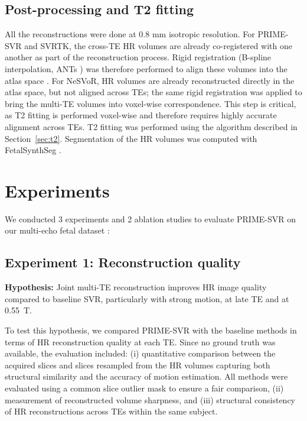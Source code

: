 \documentclass[preprint,authoryear,12pt]{elsarticle}
\begin{document}
\subsection{Post-processing and T2 fitting}

All the reconstructions were done at 0.8 mm isotropic resolution.
For PRIME-SVR and SVRTK, the cross-TE HR volumes are already co-registered with one another as part of the reconstruction process. Rigid registration (B-spline interpolation, ANTs \citep{avants2009ants}) was therefore performed to align these volumes into the atlas space \citep{gholipour_normative_2017}. For NeSVoR, HR volumes are already reconstructed directly in the atlas space, but not aligned across TEs; the same rigid registration was applied to bring the multi-TE volumes into voxel-wise correspondence. This step is critical, as T2 fitting is performed voxel-wise and therefore requires highly accurate alignment across TEs. T2 fitting was performed using the algorithm described in Section~\ref{sec:t2}. Segmentation of the HR volumes was computed with FetalSynthSeg \citep{zalevskyi2026evaluating}.

\newpage

\section{Experiments}

We conducted 3 experiments and 2 ablation studies to evaluate PRIME-SVR on our multi-echo fetal dataset  : 

\subsection{Experiment 1: Reconstruction quality}
\begin{boxK}
\noindent\textbf{Hypothesis:} Joint multi-TE reconstruction improves HR image quality compared to baseline SVR, particularly with strong motion, at late TE and at 0.55~T.
\end{boxK}

To test this hypothesis, we compared PRIME-SVR with the baseline methods in terms of HR reconstruction quality at each TE. Since no ground truth was available, the evaluation included: (i) quantitative comparison between the acquired slices and slices resampled from the HR volumes capturing both structural similarity and the accuracy of motion estimation. All methods were evaluated using a common slice outlier mask to ensure a fair comparison, (ii) measurement of reconstructed volume sharpness, and (iii) structural consistency of HR reconstructions across TEs within the same subject.
\end{document}
